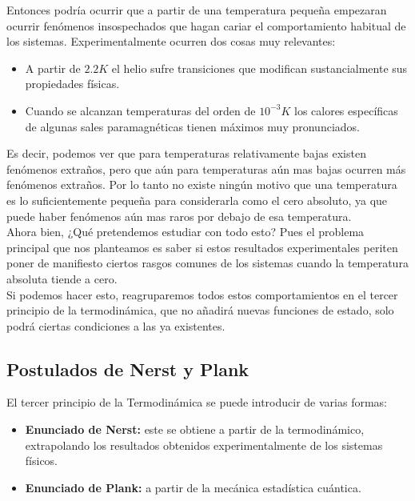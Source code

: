 \documentclass[12pt,a4paper]{article}
\begin{document}
Entonces podría ocurrir que a partir de una temperatura pequeña empezaran ocurrir fenómenos insospechados que hagan cariar el comportamiento habitual de los sistemas. Experimentalmente ocurren dos cosas muy relevantes:

\begin{itemize}
\item A partir de $2.2K$ el helio sufre transiciones que modifican sustancialmente sus propiedades físicas.

\item Cuando se alcanzan temperaturas del orden de $10^{-3} K$ los calores específicas de algunas sales paramagnéticas tienen máximos muy pronunciados.
\end{itemize}


Es decir, podemos ver que para temperaturas relativamente bajas existen fenómenos extraños, pero que aún para temperaturas aún mas bajas ocurren más fenómenos extraños. Por lo tanto no existe ningún motivo que una temperatura es lo suficientemente pequeña para considerarla como el cero absoluto, ya que puede haber fenómenos aún mas raros por debajo de esa temperatura. \\

Ahora bien, ¿Qué pretendemos estudiar con todo esto? Pues el problema principal que nos planteamos es saber si estos resultados experimentales periten poner de manifiesto ciertos rasgos comunes de los sistemas cuando la temperatura absoluta tiende a cero. \\

Si podemos hacer esto, reagruparemos todos estos comportamientos en el tercer principio de la termodinámica, que no añadirá nuevas funciones de estado, solo podrá ciertas condiciones a las ya existentes.

\subsection{Postulados de Nerst y Plank}

El tercer principio de la Termodinámica se puede introducir de varias formas: 

\begin{itemize}
\item \textbf{Enunciado de Nerst:} este se obtiene a partir de la termodinámico, extrapolando los resultados obtenidos experimentalmente de los sistemas físicos.

\item \textbf{Enunciado de Plank:} a partir de la mecánica estadística cuántica.
\end{itemize}
\end{document}
